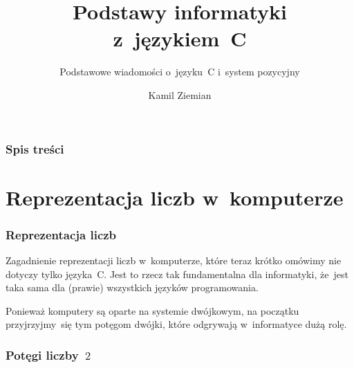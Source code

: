 \documentclass[10pt,t]{beamer}
\title{Podstawy informatyki z~językiem~C}
\subtitle{Podstawowe wiadomości o~języku~C i~system pozycyjny}
\author{Kamil Ziemian}
\begin{document}





\RaggedRight





\maketitle





\begin{frame}
  \frametitle{Spis treści}


  \tableofcontents

\end{frame}





\section{Reprezentacja liczb w~komputerze}



\begin{frame}
  \frametitle{Reprezentacja liczb}


  Zagadnienie reprezentacji liczb w~komputerze, które teraz krótko omówimy
  nie dotyczy tylko języka~C. Jest to rzecz tak fundamentalna dla
  informatyki, że~jest taka sama dla (prawie) wszystkich języków
  programowania.

  Ponieważ komputery są oparte na systemie dwójkowym, na początku
  przyjrzyjmy~się tym potęgom dwójki, które odgrywają w~informatyce
  dużą rolę.

\end{frame}





\begin{frame}
  \frametitle{Potęgi liczby~$2$}




\end{frame}
\end{document}
